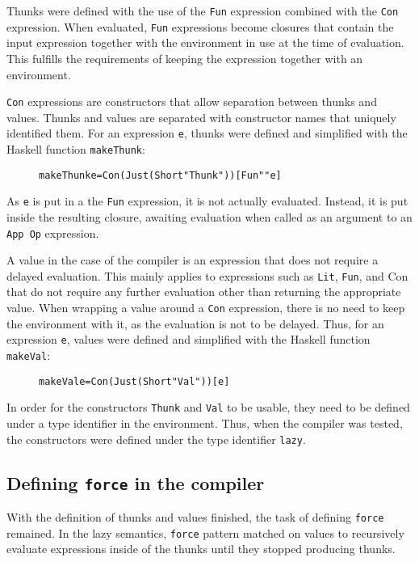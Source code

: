 Thunks were defined with the use of the \texttt{Fun} expression combined
with the \texttt{Con} expression. When evaluated, \texttt{Fun} expressions
become closures that contain the input expression together with the environment
in use at the time of evaluation. This fulfills the requirements of keeping
the expression together with an environment.

\texttt{Con} expressions are constructors that allow separation between thunks
and values. Thunks and values are separated with constructor names that
uniquely identified them. For an expression \texttt{e}, thunks were defined and
simplified with the Haskell function \texttt{makeThunk}:

\begin{figure}[H]
\begin{alltt}
  makeThunk e = Con (Just (Short "Thunk")) [Fun "" e]
\end{alltt}
\end{figure}

\noindent As \texttt{e} is put in a the \texttt{Fun} expression, it is not
actually evaluated. Instead, it is put inside the resulting closure, awaiting
evaluation when called as an argument to an \texttt{App Op} expression.

A value in the case of the compiler is an expression that does not require
a delayed evaluation. This mainly applies to expressions such as \texttt{Lit},
\texttt{Fun}, and Con that do not require any further evaluation other than returning
the appropriate value. When wrapping
a value around a \texttt{Con} expression, there
is no need to keep the environment with it, as the evaluation is not to be
delayed. Thus, for an expression \texttt{e}, values were defined and simplified
with the Haskell function \texttt{makeVal}:

\begin{figure}[H]
\begin{alltt}
  makeVal e = Con (Just (Short "Val")) [e]
\end{alltt}
\end{figure}

In order for the constructors \texttt{Thunk} and \texttt{Val} to be usable,
they need to be defined under a type identifier in the environment. Thus,
when the compiler was tested, the constructors were defined under the type
identifier \texttt{lazy}.

\subsection{Defining \texttt{force} in the compiler}
With the definition of thunks and values finished, the task of defining
\texttt{force} remained. In the lazy semantics, \texttt{force} pattern
matched on values to recursively evaluate expressions inside of the thunks until
they stopped producing thunks.

